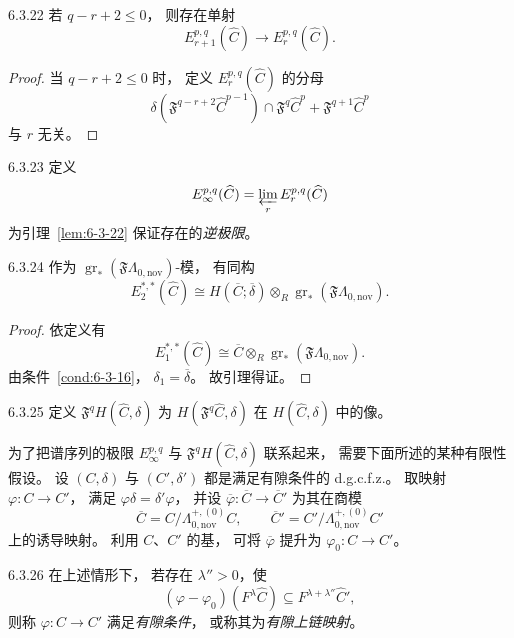 \begin{lemma}{6.3.22}\label{lem:6-3-22}
若 $q-r+2\le0$，
则存在单射
\[
E_{r+1}^{p,q}(\widehat C)
\longrightarrow E_r^{p,q}(\widehat C).
\]
\end{lemma}

\begin{proof}
当 $q-r+2\le0$ 时，
定义 $E_r^{p,q}(\widehat C)$
的分母
\[
\delta(\mathfrak F^{q-r+2}
\widehat C^{p-1})
\cap\mathfrak F^q\widehat C^p
+\mathfrak F^{q+1}\widehat C^p
\]
与 $r$ 无关。
\end{proof}

\begin{definition}{6.3.23}\label{def:6-3-23}
定义
\[
E_\infty^{p,q}(\widehat C)
=\varprojlim_r E_r^{p,q}(\widehat C)
\]
为引理~\ref{lem:6-3-22}
保证存在的\emph{逆极限}。
\end{definition}

\pagebreak
\begin{lemma}{6.3.24}\label{lem:6-3-24}
作为
$\operatorname{gr}_*(\mathfrak F\Lambda_{0,\mathrm{nov}})$-模，
有同构
\[
E_2^{*,*}(\widehat C)
\cong H(\overline C;\overline\delta)
\otimes_R
\operatorname{gr}_*(\mathfrak F\Lambda_{0,\mathrm{nov}}).
\]
\end{lemma}

\begin{proof}
依定义有
\[
E_1^{*,*}(\widehat C)
\cong\overline C\otimes_R
\operatorname{gr}_*(\mathfrak F\Lambda_{0,\mathrm{nov}}).
\]
由条件~\ref{cond:6-3-16}，
$\delta_1=\overline\delta$。
故引理得证。
\end{proof}

\begin{definition}{6.3.25}\label{def:6-3-25}
定义 $\mathfrak F^qH(\widehat C,\delta)$
为 $H(\mathfrak F^q\widehat C,\delta)$
在 $H(\widehat C,\delta)$ 中的像。
\end{definition}

为了把谱序列的极限
$E_\infty^{p,q}$
与 $\mathfrak F^qH(\widehat C,\delta)$ 联系起来，
需要下面所述的某种有限性假设。
设 $(C,\delta)$ 与 $(C',\delta')$
都是满足有隙条件的 d.g.c.f.z.。
取映射 $\varphi:C\to C'$，
满足 $\varphi\delta=\delta'\varphi$，
并设
$\overline\varphi:\overline C\to\overline C'$
为其在商模
\[
\overline C
=C/\Lambda_{0,\mathrm{nov}}^{+,(0)}C,
\qquad
\overline C'
=C'/\Lambda_{0,\mathrm{nov}}^{+,(0)}C'
\]
上的诱导映射。
利用 $C$、$C'$ 的基，
可将 $\overline\varphi$
提升为 $\varphi_0:C\to C'$。

\begin{definition}{6.3.26}\label{def:6-3-26}
在上述情形下，
若存在 $\lambda''>0$，使
\[
(\varphi-\varphi_0)
(F^\lambda\widehat C)
\subseteq F^{\lambda+\lambda''}\widehat C',
\]
则称 $\varphi:C\to C'$
满足\emph{有隙条件}，
或称其为\emph{有隙上链映射}。
\end{definition}

